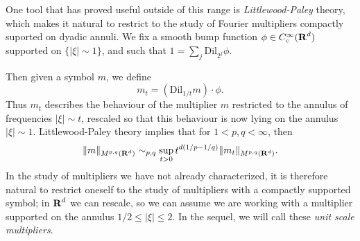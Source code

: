 One tool that has proved useful outside of this range is \emph{Littlewood-Paley} theory, which makes it natural to restrict to the study of Fourier multipliers compactly suported on dyadic annuli. We fix a smooth bump function $\phi \in C_c^\infty(\operatorname{\mathbf{R}}^d)$ supported on $\{ |\xi| \sim 1 \}$, and such that $1 = \sum_j \text{Dil}_{2^j} \phi$.
\begin{comment}
    We can therefore introduce the Littlewood-Paley projection operators $P_j$, which are Fourier multipliers with symbol $\text{Dil}_{2^j} \phi$. Littlewood-Paley theory guarantees that for $1 < r < \infty$,
%
\[ \| f \|_{L^r(\RR^d)} \sim_r \left( \sum_n \| P_n f \|_{L^r(\RR^d)}^2 \right)^{1/2}. \]
%
We also must introduce a slightly thickened function $\tilde{\phi} \in C_c^\infty(\RR^d)$ supported on $\{ \xi \in \RR^d: 1/4 \leq |\xi| \leq 4 \}$, equal to one on the support of $\phi$, and with $1 = \sum_j \text{Dil}_{2^j} \tilde{\phi}$, then we can introuce the Littlewood-Paley projections $\tilde{P}_j$ with symbol $\text{Dil}_{2^j} \tilde{\phi}$. For $1 < q < \infty$, we thus have
%
\[ \| m(D) f \|_{L^q(\RR^d)} \sim_q \left( \sum_j \| P_j m(D) f \|_{L^q(\RR^d)}^2 \right)^{1/2} = \left( \| P_j m(D) \{ \tilde{P}_j f \} \|_{L^q(\RR^d)}^2 \right)^{1/2}. \]
%
Now
%
\[ P_j m(D) \{ \tilde{P}_j f \} = \text{Dil}_{1/2^j} \{ m_{2^j}(D) \circ \text{Dil}_{2^j} \{ \tilde{P}_j f \} \}, \]
%
and so
%
\[ \| P_j m(D) \{ \tilde{P}_j f \} \|_{L^q(\RR^d)} = 2^{-jd/q} \| m_{2^j}(D) \text{Dil}_{2^j} \{ \tilde{P}_j f \} \|_{L^q(\RR^d)}. \]
%
We thus have
%
\begin{align*}
    \| m(D) f \|_{L^q(\RR^d)} &\lesssim_q \left( \sum_j 4^{jd(1/p - 1/q)} \| m_{2^j} \|_{M^{p,q}(\RR^d)}^2 \| \tilde{P}_j f \|_{L^p(\RR^d)}^2 \right)^{1/2}\\
    &\leq \left( \sup_t t^{d(1/p - 1/q)} \| m_t \|_{M^{p,q}(\RR^d)} \right) \left( \sum_j \| \tilde{P}_j f \|_{L^p(\RR^d)}^2 \right)^{1/2}\\
    &\sim_p \left( \sup_t t^{d(1/p - 1/q)} \| m_t \|_{M^{p,q}(\RR^d)} \right) \| f \|_{L^p(\RR^d)}.
\end{align*}
%
Moreover, this inequality is tight.
\end{comment}
Then given a symbol $m$, we define
%
\[ m_t = (\text{Dil}_{1/t} m) \cdot \phi. \]
%
Thus $m_t$ describes the behaviour of the multiplier $m$ restricted to the annulus of frequencies $|\xi| \sim t$, rescaled so that this behaviour is now lying on the annulus $|\xi| \sim 1$. Littlewood-Paley theory implies that for $1 < p,q < \infty$, then
%
\[ \| m \|_{M^{p,q}(\operatorname{\mathbf{R}}^d)} \sim_{p,q} \sup_{t > 0} t^{d(1/p - 1/q)} \| m_t \|_{M^{p,q}(\operatorname{\mathbf{R}}^d)}. \]
%
In the study of multipliers we have not already characterized, it is therefore natural to restrict oneself to the study of multipliers with a compactly supported symbol; in $\operatorname{\mathbf{R}}^d$ we can rescale, so we can assume we are working with a multiplier supported on the annulus $1/2 \leq |\xi| \leq 2$. In the sequel, we will call these \emph{unit scale multipliers}.

